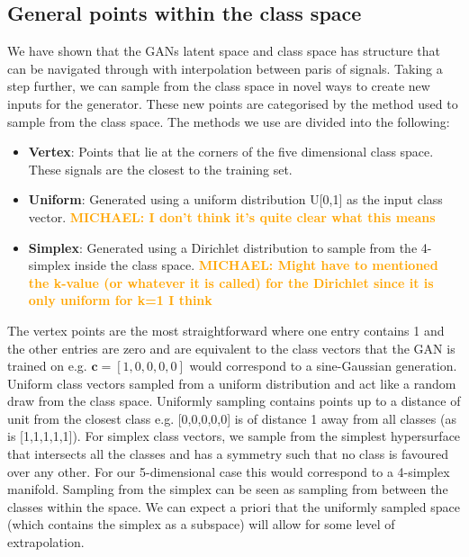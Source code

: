 \documentclass[12pt]{iopart}
\newcommand{\chris}[1]{\textbf{\textcolor{green}{CHRIS: #1}}}
\newcommand{\michael}[1]{\textbf{\textcolor{orange}{MICHAEL: #1}}}
\begin{document}
\subsection{General points within the class space}
We have shown that the \acp{GAN} latent space and class space has structure that can be navigated through with interpolation between paris of signals. Taking a step further, we can sample from the class space in novel ways to create new inputs for the generator. These new points are categorised by the method used to sample from the class space. The methods we use are divided into the following: 

\begin{itemize}
%
\item {\bf Vertex}: Points that lie at the corners of the five dimensional class space.
These signals are the closest to the training set.
%
\item {\bf Uniform}: Generated using a uniform distribution U[0,1] as the input
class vector. \michael{I don't think it's quite clear what this means}
%
\item {\bf Simplex}: Generated using a Dirichlet distribution to sample from the
4-simplex inside the class space. \michael{Might have to mentioned the k-value (or whatever it is called) for the Dirichlet since it is only uniform for k=1 I think}
%
\end{itemize}

The vertex points are the most straightforward where one entry contains 1 and the other entries are zero and are equivalent to the class vectors that the GAN is trained on e.g. $\mathbf{c} = [1,0,0,0,0]$ would correspond to a sine-Gaussian generation. Uniform class vectors sampled from a uniform distribution and act like a random draw from the class space. Uniformly sampling contains points up to a distance of unit from the closest class e.g. [0,0,0,0,0] is of distance 1 away from all classes (as is [1,1,1,1,1]). For simplex class vectors, we sample from the simplest hypersurface that intersects all the classes and has a symmetry such that no class is favoured over any other. For our 5-dimensional case this would correspond to a 4-simplex manifold. Sampling from the simplex can be seen as sampling from between the classes within the space. We can expect a priori that the uniformly sampled space (which contains the simplex as a subspace) will allow for some level of extrapolation. 

\end{document}
